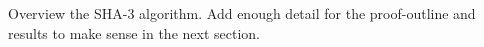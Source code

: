 Overview the SHA-3 algorithm.
Add enough detail for the proof-outline and results to make sense in the next section.


